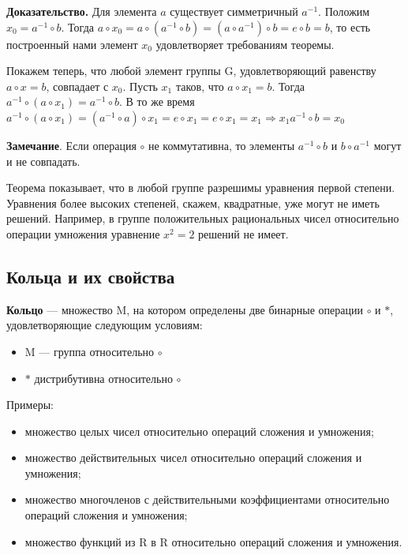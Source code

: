 \documentclass[a4paper]{article}
\begin{document}
    \begin{hproof}
        \textbf{Доказательство.}  Для элемента $a$ существует симметричный $a^{-1}$. Положим
        $x_0 = a^{-1} \circ b.$ Тогда
        $a \circ x_0 = a \circ (a^{-1} \circ b) = (a \circ a^{-1} ) \circ b = e \circ b = b$, то есть построенный нами элемент $x_0$ удовлетворяет требованиям теоремы.

        Покажем теперь, что любой элемент группы G, удовлетворяющий равенству $a \circ x = b$, совпадает с $x_0$. Пусть $x_1$ таков, что $a \circ x_1 = b$. Тогда $a^{-1} \circ (a \circ x_1) = a^{-1} \circ b$. В то же время $a^{-1} \circ (a \circ x_1) = (a^{-1} \circ a) \circ x_1 = e \circ x_1 = e \circ x_1 = x_1 \Rightarrow x_1 a^{-1} \circ b = x_0$

        \textbf{Замечание}. Если операция $\circ$  не коммутативна, то элементы $a^{-1} \circ b$ и $b \circ a^{-1}$ могут и не совпадать.
    \end{hproof}

    Теорема показывает, что в любой группе разрешимы уравнения первой
    степени. Уравнения более высоких степеней, скажем, квадратные, уже могут не
    иметь решений. Например, в группе положительных рациональных чисел
    относительно операции умножения уравнение $x^2 = 2$ решений не имеет.


    \newpage \begin{center}
                 \begin{Large}
                 \end{Large}
    \end{center}

    \subsection*{Кольца и их свойства}
    \textbf{Кольцо} --- множество M, на котором определены две бинарные операции $\circ$ и $*$, удовлетворяющие следующим условиям:
    \begin{itemize}
        \item M --- группа относительно $\circ$
        \item $*$ дистрибутивна относительно $\circ$
    \end{itemize}

    Примеры:
    \begin{itemize}
        \item множество целых чисел относительно операций сложения и умножения;
        \item множество действительных чисел относительно операций сложения и
        умножения;
        \item множество многочленов с действительными коэффициентами
        относительно операций сложения и умножения;
        \item множество функций из R в R относительно операций сложения и умножения.
    \end{itemize}
\end{document}
